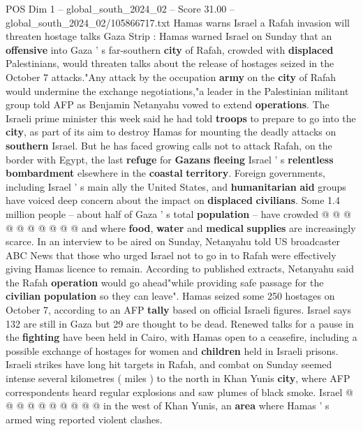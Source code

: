 \begin{textsample}{POS Dim 1 – global\_south\_2024\_02 – Score 31.00 – global\_south\_2024\_02/105866717.txt}  \label{ex:f1_pos_030}
Hamas warns Israel a Rafah invasion will threaten hostage talks Gaza Strip : Hamas warned Israel on Sunday that an \textbf{offensive} into Gaza ' s far-southern \textbf{city} of Rafah, crowded with \textbf{displaced} Palestinians, would threaten talks about the release of hostages seized in the October 7 attacks."Any attack by the occupation \textbf{army} on the \textbf{city} of Rafah would undermine the exchange negotiations,"a leader in the Palestinian militant group told AFP as Benjamin Netanyahu vowed to extend \textbf{operations}.
The Israeli prime minister this week said he had told \textbf{troops} to prepare to go into the \textbf{city}, as part of its aim to destroy Hamas for mounting the deadly attacks on \textbf{southern} Israel.
But he has faced growing calls not to attack Rafah, on the border with Egypt, the last \textbf{refuge} for \textbf{Gazans} \textbf{fleeing} Israel ' s \textbf{relentless} \textbf{bombardment} elsewhere in the \textbf{coastal} \textbf{territory}.
Foreign governments, including Israel ' s main ally the United States, and \textbf{humanitarian} \textbf{aid} groups have voiced deep concern about the impact on \textbf{displaced} \textbf{civilians}.
Some 1.4 million people -- about half of Gaza ' s total \textbf{population} -- have crowded @ @ @ @ @ @ @ @ @ @ and where \textbf{food}, \textbf{water} and \textbf{medical} \textbf{supplies} are increasingly scarce.
In an interview to be aired on Sunday, Netanyahu told US broadcaster ABC News that those who urged Israel not to go in to Rafah were effectively giving Hamas licence to remain.
According to published extracts, Netanyahu said the Rafah \textbf{operation} would go ahead"while providing safe passage for the \textbf{civilian} \textbf{population} so they can leave".
Hamas seized some 250 hostages on October 7, according to an AFP \textbf{tally} based on official Israeli figures.
Israel says 132 are still in Gaza but 29 are thought to be dead.
Renewed talks for a pause in the \textbf{fighting} have been held in Cairo, with Hamas open to a ceasefire, including a possible exchange of hostages for women and \textbf{children} held in Israeli prisons.
Israeli strikes have long hit targets in Rafah, and combat on Sunday seemed intense several kilometres ( miles ) to the north in Khan Yunis \textbf{city}, where AFP correspondents heard regular explosions and saw plumes of black smoke.
Israel @ @ @ @ @ @ @ @ @ @ in the west of Khan Yunis, an \textbf{area} where Hamas ' s armed wing reported violent clashes.

\end{textsample}

